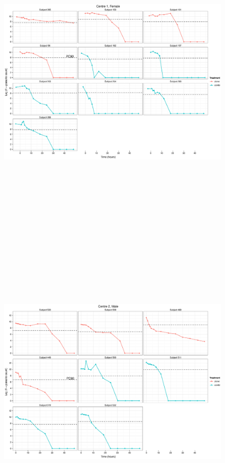 \begin{singlespace}
\begin{figure}
\includegraphics[height=150mm]{Araw1F.eps}
\end{figure}
\begin{figure}
\centering
\includegraphics[height=150mm]{Araw2M.eps}

\end{figure}
\end{singlespace}
